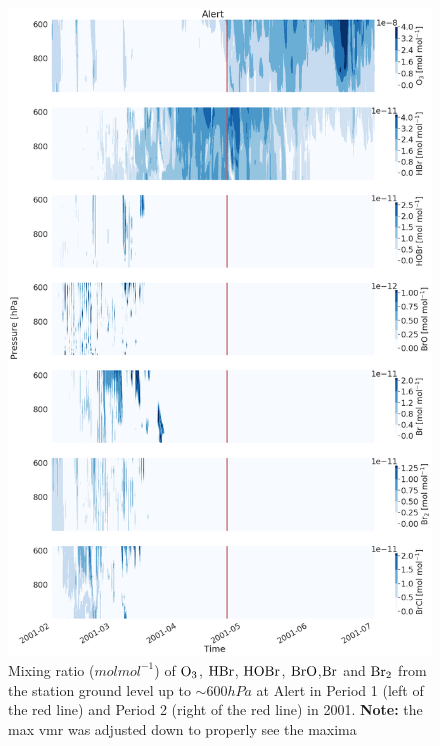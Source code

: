 \begin{figure}[h]
    \centering
    \includegraphics[width=0.8\linewidth]{Chapter6_Results/images/Vert_StationComp_2001/vert_all_species_ALT.png}
    \caption{Mixing ratio ($mol mol^{-1}$) of $\mathrm{O_3}$, $\mathrm{HBr}$, $\mathrm{HOBr}$, $\mathrm{BrO}$,$\mathrm{Br}$ and $\mathrm{Br_2}$ from the station ground level up to $\sim 600 hPa$ at Alert in Period 1 (left of the red line) and Period 2 (right of the red line) in 2001. \textbf{Note:} the max  vmr was adjusted down to properly see the maxima}
    \label{fig:vert_ALT}
\end{figure}